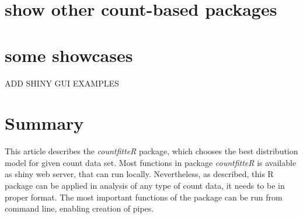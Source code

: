 
\section{show other count-based packages}


\section{some showcases}

ADD SHINY GUI EXAMPLES

\section{Summary}

This article describes the \emph{countfitteR} package, which chooses the best distribution model for given count data set. Most functions in package \emph{countfitteR} is available as shiny web server, that can run locally. Nevertheless, as described, this R package can be applied in analysis of any type of count data, it needs to be in proper format. 
The most important functions of the package can be run from command line, enabling creation of pipes.



\address{Jaros\l{}aw Chilmoniuk\\
  University of Wroc\l{}aw\\
  Pl. Uniwersytecki 1, Wroc\l{}aw\\
  Poland\\
  ORCiD: 0000-0001-5467-018X\\
  }

\address{Madeleine Ruhe\\
  Brandenburg University of Technology Cottbus - Senftenberg\\
  Universit\"atsplatz 1, Senftenberg\\
  Germany\\
  ORCiD if desired\\
  }

